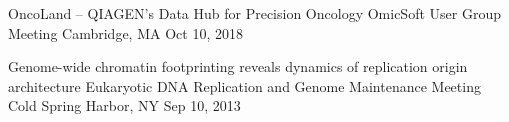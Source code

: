 

\begin{presentations}


  \presentation
    {OncoLand -- QIAGEN's Data Hub for Precision Oncology}
    {OmicSoft User Group Meeting} %
    {Cambridge, MA} %
    {Oct 10, 2018} %

  \presentation
    {Genome-wide chromatin footprinting reveals dynamics of replication origin architecture}
    {Eukaryotic DNA Replication and Genome Maintenance Meeting} %
    {Cold Spring Harbor, NY} %
    {Sep 10, 2013} %


\end{presentations}
\vspace{-2mm}
